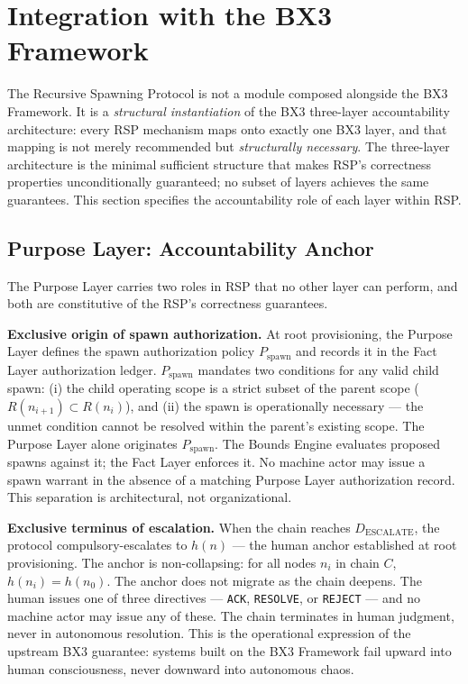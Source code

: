 \section{Integration with the BX3 Framework}
\label{sec:rs-integration}

The Recursive Spawning Protocol is not a module composed alongside the BX3 Framework. It is a \textit{structural instantiation} of the BX3 three-layer accountability architecture: every RSP mechanism maps onto exactly one BX3 layer, and that mapping is not merely recommended but \textit{structurally necessary}. The three-layer architecture is the minimal sufficient structure that makes RSP's correctness properties unconditionally guaranteed; no subset of layers achieves the same guarantees. This section specifies the accountability role of each layer within RSP.

\subsection{Purpose Layer: Accountability Anchor}
\label{sec:rs-purpose-anchor}

The Purpose Layer carries two roles in RSP that no other layer can perform, and both are constitutive of the RSP's correctness guarantees.

\medskip
\noindent\textbf{Exclusive origin of spawn authorization.} At root provisioning, the Purpose Layer defines the spawn authorization policy $P_{\mathrm{spawn}}$ and records it in the Fact Layer authorization ledger. $P_{\mathrm{spawn}}$ mandates two conditions for any valid child spawn: (i) the child operating scope is a strict subset of the parent scope ($R(n_{i+1}) \subset R(n_i)$), and (ii) the spawn is operationally necessary — the unmet condition cannot be resolved within the parent's existing scope. The Purpose Layer alone originates $P_{\mathrm{spawn}}$. The Bounds Engine evaluates proposed spawns against it; the Fact Layer enforces it. No machine actor may issue a spawn warrant in the absence of a matching Purpose Layer authorization record. This separation is architectural, not organizational.

\medskip
\noindent\textbf{Exclusive terminus of escalation.} When the chain reaches $D_{\mathrm{ESCALATE}}$, the protocol compulsory-escalates to $h(n)$ — the human anchor established at root provisioning. The anchor is non-collapsing: for all nodes $n_i$ in chain $C$, $h(n_i) = h(n_0)$. The anchor does not migrate as the chain deepens. The human issues one of three directives — \texttt{ACK}, \texttt{RESOLVE}, or \texttt{REJECT} — and no machine actor may issue any of these. The chain terminates in human judgment, never in autonomous resolution. This is the operational expression of the upstream BX3 guarantee: systems built on the BX3 Framework fail upward into human consciousness, never downward into autonomous chaos.

